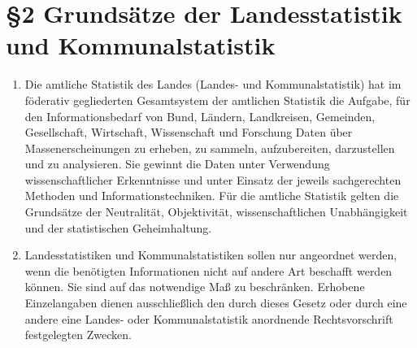     \section[Grundsätze]{\S2 Grundsätze der Landesstatistik und Kommunalstatistik}
        \begin{enumerate}[label=(\arabic*)]
            \item Die amtliche Statistik des Landes (Landes- und Kommunalstatistik) hat im föderativ gegliederten Gesamtsystem der amtlichen Statistik die Aufgabe, für den Informationsbedarf von Bund, Ländern, Landkreisen, Gemeinden, Gesellschaft, Wirtschaft, Wissenschaft und Forschung Daten über Massenerscheinungen zu erheben, zu sammeln, aufzubereiten, darzustellen und zu analysieren. Sie gewinnt die Daten unter Verwendung wissenschaftlicher Erkenntnisse und unter Einsatz der jeweils sachgerechten Methoden und Informationstechniken. Für die amtliche Statistik gelten die Grundsätze der Neutralität, Objektivität, wissenschaftlichen Unabhängigkeit und der statistischen Geheimhaltung.
            \item Landesstatistiken und Kommunalstatistiken sollen nur angeordnet werden, wenn die benötigten Informationen nicht auf andere Art beschafft werden können. Sie sind auf das notwendige Maß zu beschränken. Erhobene Einzelangaben dienen ausschließlich den durch dieses Gesetz oder durch eine andere eine Landes- oder Kommunalstatistik anordnende Rechtsvorschrift festgelegten Zwecken.
        \end{enumerate}

